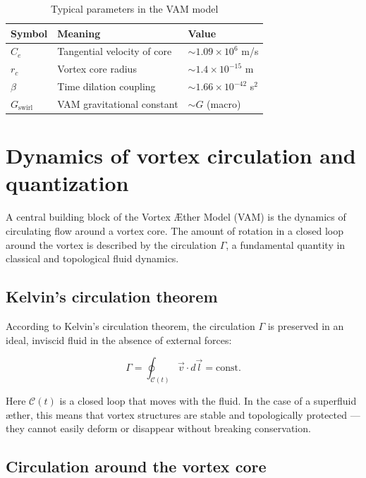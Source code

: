 \documentclass[preprint]{revtex4-2}
\begin{document}
\begin{table}[h!]
    \centering
    \caption{Typical parameters in the VAM model}
    \label{tab:constants}
    \begin{tabular}{lll}
        \toprule
        Symbol & Meaning & Value \\
        \midrule
        $C_e$ & Tangential velocity of core & $\sim 1.09 \times 10^6$ m/s \\
        $r_c$ & Vortex core radius & $\sim 1.4 \times 10^{-15}$ m \\
        $\beta$ & Time dilation coupling & $\sim 1.66 \times 10^{-42}$ s$^2$ \\
        $G_\text{swirl}$ & VAM gravitational constant & $\sim G$ (macro) \\
        \bottomrule
    \end{tabular}
\end{table}
\section{Dynamics of vortex circulation and quantization}\label{sec:appendix:4}

A central building block of the Vortex Æther Model (VAM) is the dynamics of circulating flow around a vortex core. The amount of rotation in a closed loop around the vortex is described by the circulation \( \Gamma \), a fundamental quantity in classical and topological fluid dynamics.

\subsection{Kelvin's circulation theorem}

According to Kelvin's circulation theorem, the circulation \( \Gamma \) is preserved in an ideal, inviscid fluid in the absence of external forces:

\begin{equation}
    \Gamma = \oint_{\mathcal{C}(t)} \vec{v} \cdot d\vec{l} = \text{const.}
\end{equation}

Here \( \mathcal{C}(t) \) is a closed loop that moves with the fluid. In the case of a superfluid æther, this means that vortex structures are stable and topologically protected — they cannot easily deform or disappear without breaking conservation.

\subsection{Circulation around the vortex core}
\end{document}
